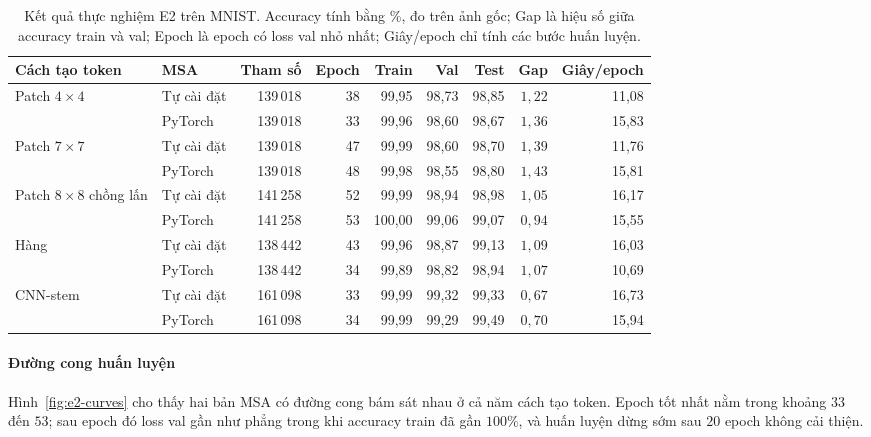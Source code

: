 \documentclass[a4paper,12pt]{article}
\begin{document}
\begin{table}[htbp]
    \centering
    \caption{Kết quả thực nghiệm E2 trên MNIST. Accuracy tính bằng \%, đo trên ảnh gốc; Gap là hiệu số giữa accuracy train và val; Epoch là epoch có loss val nhỏ nhất; Giây/epoch chỉ tính các bước huấn luyện.}
    \label{tab:e2-results}
    \small
    \setlength{\tabcolsep}{3.5pt}
    \begin{tabular}{llrrrrrrr}
        \toprule
        Cách tạo token             & MSA        & Tham số  & Epoch & Train  & Val   & Test  & Gap      & Giây/epoch \\
        \midrule
        Patch $4\times4$           & Tự cài đặt & 139\,018 & 38    & 99,95  & 98,73 & 98,85 & $1{,}22$ & 11,08      \\
                                   & PyTorch    & 139\,018 & 33    & 99,96  & 98,60 & 98,67 & $1{,}36$ & 15,83      \\
        \addlinespace
        Patch $7\times7$           & Tự cài đặt & 139\,018 & 47    & 99,99  & 98,60 & 98,70 & $1{,}39$ & 11,76      \\
                                   & PyTorch    & 139\,018 & 48    & 99,98  & 98,55 & 98,80 & $1{,}43$ & 15,81      \\
        \addlinespace
        Patch $8\times8$ chồng lấn & Tự cài đặt & 141\,258 & 52    & 99,99  & 98,94 & 98,98 & $1{,}05$ & 16,17      \\
                                   & PyTorch    & 141\,258 & 53    & 100,00 & 99,06 & 99,07 & $0{,}94$ & 15,55      \\
        \addlinespace
        Hàng                       & Tự cài đặt & 138\,442 & 43    & 99,96  & 98,87 & 99,13 & $1{,}09$ & 16,03      \\
                                   & PyTorch    & 138\,442 & 34    & 99,89  & 98,82 & 98,94 & $1{,}07$ & 10,69      \\
        \addlinespace
        CNN-stem                   & Tự cài đặt & 161\,098 & 33    & 99,99  & 99,32 & 99,33 & $0{,}67$ & 16,73      \\
                                   & PyTorch    & 161\,098 & 34    & 99,99  & 99,29 & 99,49 & $0{,}70$ & 15,94      \\
        \bottomrule
    \end{tabular}
\end{table}

\paragraph{Đường cong huấn luyện} Hình~\ref{fig:e2-curves} cho thấy hai bản MSA có đường cong bám sát nhau ở cả năm cách tạo token. Epoch tốt nhất nằm trong khoảng $33$ đến $53$; sau epoch đó loss val gần như phẳng trong khi accuracy train đã gần $100\%$, và huấn luyện dừng sớm sau $20$ epoch không cải thiện.
\end{document}
